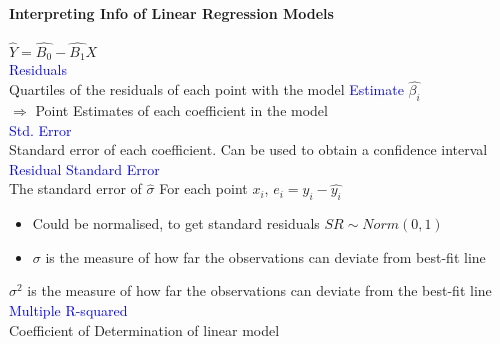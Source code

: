 \paragraph{Interpreting Info of Linear Regression Models}
$\hat{Y}=\hat{B_0}-\hat{B_1}X$\\
\textcolor{Blue}{Residuals}\\
Quartiles of the residuals of each point with the model
\textcolor{Blue}{Estimate} $\hat{\beta_i}$\\
$\Rightarrow$ Point Estimates of each coefficient in the model\\
\textcolor{Blue}{Std. Error}\\
Standard error of each coefficient. Can be used to obtain a confidence interval\\
\textcolor{Blue}{Residual Standard Error}\\
The standard error of $\hat{\sigma}$
For each point $x_i$, $e_i=y_i-\hat{y_i}$
\begin{itemize}
	\item Could be normalised, to get standard residuals $SR\sim Norm(0,1)$
	\item $\sigma$ is the measure of how far the observations can deviate from best-fit line
\end{itemize}
$\sigma^2$ is the measure of how far the observations can deviate from the best-fit line\\
\textcolor{Blue}{Multiple R-squared}\\
Coefficient of Determination of linear model
